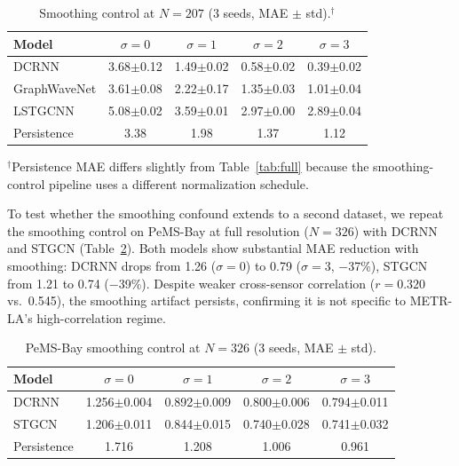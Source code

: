 \documentclass[sigconf]{acmart}
\begin{document}
\begin{table}[t]
\small
\centering
\caption{Smoothing control at $N{=}207$ (3 seeds, MAE $\pm$ std).$^{\dagger}$}
\label{tab:smoothing}
\begin{tabular}{lcccc}
\toprule
Model & $\sigma{=}0$ & $\sigma{=}1$ & $\sigma{=}2$ & $\sigma{=}3$ \\
\midrule
DCRNN        & 3.68{\scriptsize$\pm$0.12} & 1.49{\scriptsize$\pm$0.02} & 0.58{\scriptsize$\pm$0.02} & 0.39{\scriptsize$\pm$0.02} \\
GraphWaveNet & 3.61{\scriptsize$\pm$0.08} & 2.22{\scriptsize$\pm$0.17} & 1.35{\scriptsize$\pm$0.03} & 1.01{\scriptsize$\pm$0.04} \\
LSTGCNN      & 5.08{\scriptsize$\pm$0.02} & 3.59{\scriptsize$\pm$0.01} & 2.97{\scriptsize$\pm$0.00} & 2.89{\scriptsize$\pm$0.04} \\
\midrule
Persistence  & 3.38 & 1.98 & 1.37 & 1.12 \\
\bottomrule
\end{tabular}
\vspace{-2pt}
{\footnotesize $^{\dagger}$Persistence MAE differs slightly from Table~\ref{tab:full} because the smoothing-control pipeline uses a different normalization schedule.}
\end{table}

To test whether the smoothing confound extends to a second dataset, we repeat the smoothing control on PeMS-Bay at full resolution ($N{=}326$) with DCRNN and STGCN (Table~\ref{tab:smoothing_pems}). Both models show substantial MAE reduction with smoothing: DCRNN drops from 1.26 ($\sigma{=}0$) to 0.79 ($\sigma{=}3$, $-$37\%), STGCN from 1.21 to 0.74 ($-$39\%). Despite weaker cross-sensor correlation ($r{=}0.320$ vs.\ 0.545), the smoothing artifact persists, confirming it is not specific to METR-LA's high-correlation regime.

\begin{table}[t]
\small
\centering
\caption{PeMS-Bay smoothing control at $N{=}326$ (3 seeds, MAE $\pm$ std).}
\label{tab:smoothing_pems}
\begin{tabular}{lcccc}
\toprule
Model & $\sigma{=}0$ & $\sigma{=}1$ & $\sigma{=}2$ & $\sigma{=}3$ \\
\midrule
DCRNN & 1.256{\scriptsize$\pm$0.004} & 0.892{\scriptsize$\pm$0.009} & 0.800{\scriptsize$\pm$0.006} & 0.794{\scriptsize$\pm$0.011} \\
STGCN & 1.206{\scriptsize$\pm$0.011} & 0.844{\scriptsize$\pm$0.015} & 0.740{\scriptsize$\pm$0.028} & 0.741{\scriptsize$\pm$0.032} \\
Persistence & 1.716 & 1.208 & 1.006 & 0.961 \\
\bottomrule
\end{tabular}
\end{table}
\end{document}
